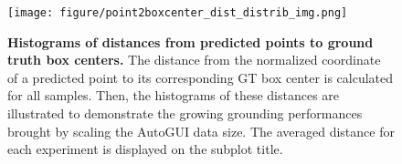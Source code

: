 \begin{figure}[h]
    \centering
    \texttt{[image: figure/point2boxcenter\_dist\_distrib\_img.png]}
    \caption{\textbf{Histograms of distances from predicted points to ground truth box centers.} The distance from the normalized coordinate of a predicted point to its corresponding GT box center is calculated for all samples. Then, the histograms of these distances are illustrated to demonstrate the growing grounding performances brought by scaling the AutoGUI data size. The averaged distance for each experiment is displayed on the subplot title.}
    \label{fig: dist histogram}
\end{figure}
